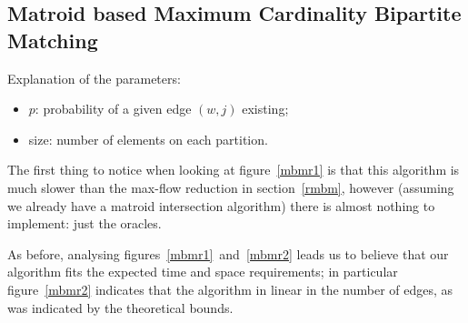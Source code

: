 \documentclass[a4,11pt]{article}
\begin{document}
\subsection{Matroid based Maximum Cardinality Bipartite Matching}
Explanation of the parameters:
\begin{itemize}
    \setlength\itemsep{-.1em}
    \item $p$: probability of a given edge $(w,j)$ existing;
    \item size: number of elements on each partition.
\end{itemize}

The first thing to notice when looking at figure~\ref{mbmr1} is that this algorithm is much slower than the max-flow reduction in section~\ref{rmbm}, however (assuming we already have a matroid intersection algorithm) there is almost nothing to implement: just the oracles.

As before, analysing figures~\ref{mbmr1}~and~\ref{mbmr2} leads us to believe that our algorithm fits the expected time and space requirements; in particular figure~\ref{mbmr2} indicates that the algorithm in linear in the number of edges, as was indicated by the theoretical bounds.
\end{document}
